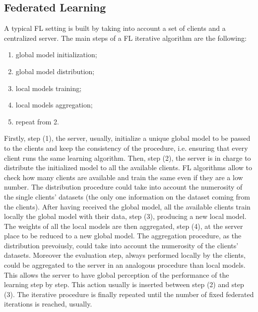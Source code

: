\documentclass{article} %
\begin{document}
\subsection{Federated Learning}
A typical FL setting 
is built by taking into account a set of clients and a centralized server.
The main steps of a FL iterative algorithm are the following:
\begin{enumerate}
    \item global model initialization;
    \item global model distribution;
    \item local models training;
    \item local models aggregation;
    \item repeat from 2.
\end{enumerate}
Firstly, step (1), the server, usually, initialize a unique global model to be 
passed to the clients and keep the consistency of the procedure, i.e. ensuring 
that every client runs the same learning algorithm.
Then, step (2), the server is in charge to distribute the initialized model to 
all the available clients. FL algorithms allow to check how many clients are 
available and train the same even if they are a low number. The distribution 
procedure could take into account the numerosity of the single clients' datasets 
(the only one information on the dataset coming from the clients).
After having received the global model, all the available clients train locally
the global model with their data, step (3), producing a new local model.
The weights of all the local models are then aggregated, step (4), at the server 
place to be reduced to a new global model. The aggregation procedure, as the 
distribution prevoiusly, could take into account the numerosity of the clients' 
datasets.
Moreover the evaluation step, always performed locally by the clients, could be
aggregated to the server in an analogous procedure than local models. This allows
the server to have global perception of the performance of the learning step by 
step. This action usually is inserted between step (2) and step (3).
The iterative procedure is finally repeated until the number of fixed federated 
iterations is reached, usually.
\end{document}
